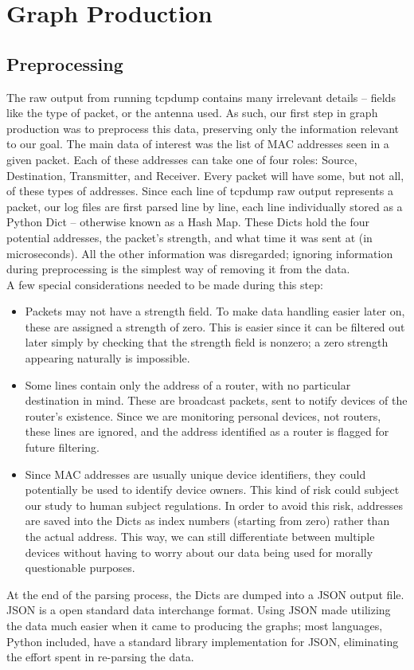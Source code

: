 \documentclass[11pt,journal,compsoc]{IEEEtran} %
\begin{document}
\section{Graph Production}

\subsection*{Preprocessing}

	The raw output from running tcpdump contains many irrelevant details -- fields like the type of packet, or the antenna used.
	As such, our first step in graph production was to preprocess this data, preserving only the information relevant to our goal.
    The main data of interest was the list of MAC addresses seen in a given packet.
    Each of these addresses can take one of four roles: Source, Destination, Transmitter, and Receiver.
    Every packet will have some, but not all, of these types of addresses.
    Since each line of tcpdump raw output represents a packet, our log files are first parsed line by line, each line individually stored as a Python Dict -- otherwise known as a Hash Map.
    These Dicts hold the four potential addresses, the packet's strength, and what time it was sent at (in microseconds).
    All the other information was disregarded; ignoring information during preprocessing is the simplest way of removing it from the data.\\
    A few special considerations needed to be made during this step:
    \begin{itemize}
    \item Packets may not have a strength field.
      To make data handling easier later on, these are assigned a strength of zero.
      This is easier since it can be filtered out later simply by checking that the strength field is nonzero; a zero strength appearing naturally is impossible. 
    \item Some lines contain only the address of a router, with no particular destination in mind.
      These are broadcast packets, sent to notify devices of the router's existence.
      Since we are monitoring personal devices, not routers, these lines are ignored, and the address identified as a router is flagged for future filtering.
    \item Since MAC addresses are usually unique device identifiers, they could potentially be used to identify device owners.
      This kind of risk could subject our study to human subject regulations.
      In order to avoid this risk, addresses are saved into the Dicts as index numbers (starting from zero) rather than the actual address.
      This way, we can still differentiate between multiple devices without having to worry about our data being used for morally questionable purposes.
    \end{itemize}
    At the end of the parsing process, the Dicts are dumped into a JSON output file.
    JSON is a open standard data interchange format.
    Using JSON made utilizing the data much easier when it came to producing the graphs; most languages, Python included, have a standard library implementation for JSON, eliminating the effort spent in re-parsing the data.
\end{document}
